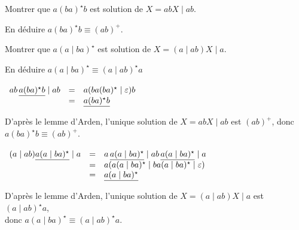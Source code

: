 
\begingroup

\begin{exercice}\label{exo:lexing/arden/simplify_regexp}

  \begin{questions}
  \item Montrer que $a(ba)^\star  b$ est solution de $X = ab X \mid ab$. 
  \item En déduire $a(ba)^\star  b \equiv (ab)^+$.
  \item Montrer que $a(a\mid ba)^\star$ est solution de $X = (a \mid ab) X \mid a$.
  \item En déduire $a(a\mid ba)^\star \equiv (a\mid ab)^\star  a$
  \end{questions}

\end{exercice}

\begin{corrections}

  \begin{questions}
  \item $\begin{array}[t]{rcl}
    ab\, \underline{a(ba)^\star  b} \mid ab
    &=& a  (ba(ba)^\star \mid \varepsilon ) b \\
    &=& \underline{a  (ba)^\star b} \\
  \end{array}$
  \item D'après le lemme d'Arden, l'unique solution de $X = ab X \mid ab$ est $(ab)^+$, donc $a(ba)^\star  b \equiv (ab)^+$. 
  \item $\begin{array}[t]{rcl}
    (a \mid ab) \underline{a(a\mid ba)^\star} \mid a
    &=& a \,\underline{a(a\mid ba)^\star} \mid ab \,\underline{a(a\mid ba)^\star} \mid a\\
    &=&  a (a(a\mid ba)^\star \mid ba(a\mid ba)^\star \mid \varepsilon)\\
    &=& \underline{a(a\mid ba)^\star} \\
  \end{array}$
  \item D'après le lemme d'Arden, l'unique solution de $X = (a\mid ab) X \mid a$ est $(a\mid ab)^\star a$, \\donc $a(a\mid ba)^\star \equiv (a\mid ab)^\star  a$. 
  \end{questions}

\end{corrections}

\endgroup
\endinput
